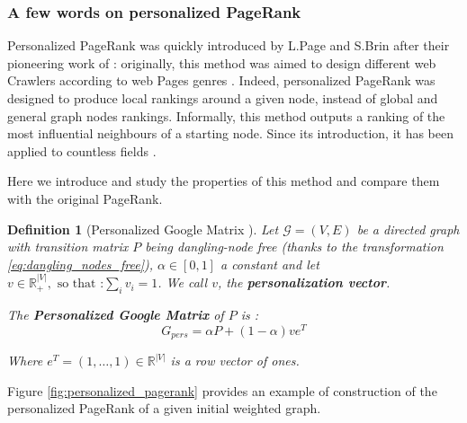 \documentclass{article}
\newtheorem{definition}{Definition}[section]
\begin{document}
\subsubsection{A few words on personalized PageRank} \label{subsec:preferential_pagerank}
Personalized PageRank was quickly introduced by L.Page and S.Brin after their pioneering work of \cite{brin_page_1998}: originally, this method was aimed to design different web Crawlers according to web Pages genres \cite{haveliwala_2003}. Indeed, personalized PageRank was designed to produce local rankings around a given node, instead of global and general graph nodes rankings. Informally, this method outputs a ranking of the most influential neighbours of a starting node.
Since its introduction, it has been applied to countless fields \cite{gleich_2015}.

Here we introduce and study the properties of this method and compare them with the original PageRank.

\begin{definition}[Personalized Google Matrix \cite{gleich_2015}]
Let $\mathcal{G}=(V,E)$ be a directed graph with transition matrix $P$ being dangling-node free (thanks to the transformation \ref{eq:dangling_nodes_free}), $\alpha \in [0,1]$ a constant and let $v \in \mathbb{R}_{+}^{|V|}, \mbox{ so that :} \sum_{i} v_i = 1$. We call $v$, the \textbf{personalization vector}. 

The \textbf{Personalized Google Matrix} of $P$ is :
\begin{equation}
    G_{pers} = \alpha P + (1-\alpha) ve^T
\end{equation}

Where $e^T=(1, \hdots, 1) \in \mathbb{R}^{|V|}$ is a row vector of ones. 

\end{definition}

Figure \ref{fig:personalized_pagerank} provides an example of construction of the personalized PageRank of a given initial weighted graph.
\end{document}
